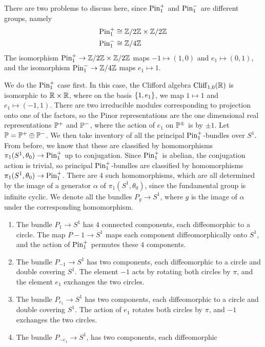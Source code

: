 \begin{exmp}
There are two problems to discuss here, since $\Pin_1^+$ and $\Pin_1^-$ are
different groups, namely
%
\begin{align*}
\Pin_1^+ &\cong \Z/2\Z \times \Z / 2\Z \\
\Pin_1^- &\cong \Z/4\Z
\end{align*}
The isomorphism $\Pin^+_1 \to \Z/2\Z \times \Z/2\Z$ maps $-1 \mapsto (1,0)$ and
$e_1 \mapsto (0,1)$, and the isomorphism $\Pin^-_1 \to \Z/4\Z$ maps $e_1 \mapsto 1$.
%

We do the $\Pin_1^+$ case first. In this case, the Clifford algebra
$\Cliff_{1,0}(\R)$ is isomorphic to $\R \times \R$, where on the basis $\set{1,e_1}$,
we map $1\mapsto 1$ and $e_1 \mapsto (-1,1)$. There are two irreducible
modules corresponding
to projection onto one of the factors, so the Pinor representations are the one
dimensional real representations $\P^+$ and $\P^-$, where the action of $e_1$ on
$\P^\pm$ is by $\pm 1$. Let $\P = \P^+ \oplus \P^-$. We then take inventory
of all the principal $\Pin_1^+$-bundles over $S^1$. From before, we know that these
are classified by homomorphisms $\pi_1(S^1, \theta_0) \to \Pin_1^+$ up to
conjugation. Since $\Pin_1^+$ is abelian, the conjugation action is trivial,
so principal $\Pin_1^+$-bundles are classified by homomorphisms
$\pi_1(S^1,\theta_0) \to \Pin_1^+$. There are $4$ such homomorphisms,
which are all determined by the image of a generator $\alpha$ of $
\pi_1(S^1,\theta_0)$, since the fundamental group is infinite cyclic.
We denote all the bundles $P_g \to S^1$, where $g$ is the image of $\alpha$ under
the corresponding homomorphism.
%
\begin{enumerate}
  \item The bundle $P_1 \to S^1$ has $4$ connected components, each diffeomorphic
  to a circle. The map $P-1 \to S^1$ maps each component diffeomorphically onto
  $S^1$, and the action of $\Pin_1^+$ permutes these $4$ components.
  \item The bundle $P_{-1} \to S^1$ has two components, each diffeomorphic to
  a circle and double covering $S^1$. The element $-1$ acts by rotating both
  circles by $\pi$, and the element $e_1$ exchanges the two circles.
  \item The bundle $P_{e_1} \to S^1$ has two components, each diffeomorphic to a
  circle and double covering $S^1$. The action of $e_1$ rotates both circles by
  $\pi$, and $-1$ exchanges the two circles.
  \item The bundle $P_{-e_1} \to S^1$, has two components, each diffeomorphic

\end{enumerate}
\end{exmp}
